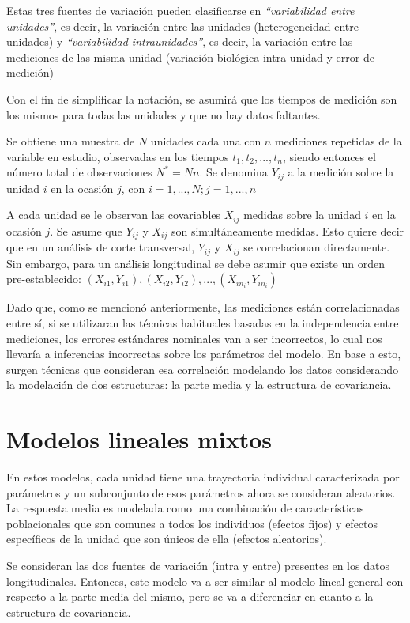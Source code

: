 \documentclass[spanish]{article}
\numberwithin{figure}{subsection}
\numberwithin{equation}{subsection}
\numberwithin{table}{subsection}
\begin{document}
Estas tres fuentes de variación pueden clasificarse en \textit{``variabilidad
entre unidades''}, es decir, la variación entre las unidades (heterogeneidad
entre unidades) y \textit{``variabilidad intraunidades''}, es decir, la
variación entre las mediciones de las misma unidad (variación biológica
intra-unidad y error de medición)

Con el fin de simplificar la notación, se asumirá que los tiempos de medición
son los mismos para todas las unidades y que no hay datos faltantes.

Se obtiene una muestra de $N$ unidades cada una con $n$ mediciones repetidas de
la variable en estudio, observadas en los tiempos $t_1, t_2, ..., t_n$, siendo
entonces el número total de observaciones $N^*=Nn$. Se denomina $Y_{ij}$ a la
medición sobre la unidad $i$ en la ocasión $j$, con $i=1, ..., N; j=1, ..., n$

A cada unidad se le observan las covariables $X_{ij}$ medidas sobre la unidad $i$
en la ocasión $j$. Se asume que $Y_{ij}$ y $X_{ij}$ son simultáneamente medidas.
Esto quiere decir que en un análisis de corte transversal, $Y_{ij}$ y $X_{ij}$
se correlacionan directamente. Sin embargo, para un análisis longitudinal se
debe asumir que existe un orden pre-establecido: $(X_{i1}, Y_{i1}), (X_{i2},
Y_{i2}), ..., (X_{in_i}, Y_{in_i})$

Dado que, como se mencionó anteriormente, las mediciones están correlacionadas
entre sí, si se utilizaran las técnicas habituales basadas en la independencia
entre mediciones, los errores estándares nominales van a ser incorrectos, lo
cual nos llevaría a inferencias incorrectas sobre los parámetros del modelo. En
base a esto, surgen técnicas que consideran esa correlación modelando los datos
considerando la modelación de dos estructuras: la parte media y la estructura
de covariancia.

\section{Modelos lineales mixtos}

En estos modelos, cada unidad tiene una trayectoria individual caracterizada
por parámetros y un subconjunto de esos parámetros ahora se consideran
aleatorios. La respuesta media es modelada como una combinación de
características poblacionales que son comunes a todos los individuos (efectos
fijos) y efectos específicos de la unidad que son únicos de ella (efectos
aleatorios).

Se consideran las dos fuentes de variación (intra y entre) presentes en los
datos longitudinales. Entonces, este modelo va a ser similar al modelo lineal
general con respecto a la parte media del mismo, pero se va a diferenciar en
cuanto a la estructura de covariancia.
\end{document}
